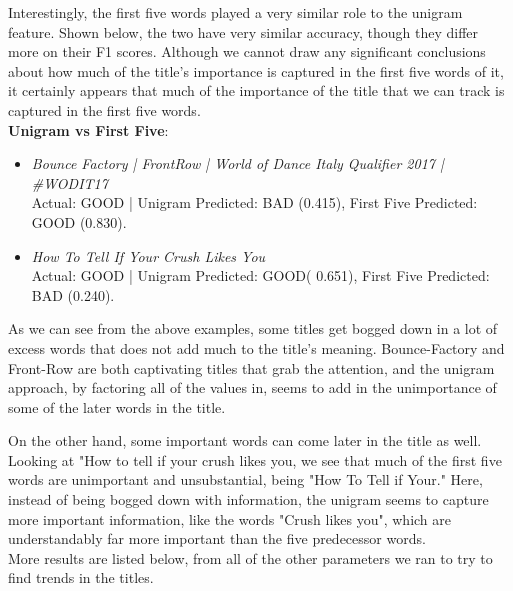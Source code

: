 \documentclass[a4paper,12pt]{article}
\begin{document}
Interestingly, the first five words played a very similar role to the unigram feature. Shown below, the two have very similar accuracy, though they differ more on their F1 scores. Although we cannot draw any significant conclusions about how much of the title's importance is captured in the first five words of it, it certainly appears that much of the importance of the title that we can track is captured in the first five words.
\\

\textbf{Unigram vs First Five}:

\begin{itemize}
		\item \textit{Bounce Factory | FrontRow | World of Dance Italy Qualifier 2017 | \#WODIT17} \\
	Actual: GOOD | Unigram Predicted: BAD (0.415), First Five Predicted: GOOD (0.830).
	
	\item \textit{How To Tell If Your Crush Likes You}\\
	 Actual: GOOD | Unigram Predicted: GOOD( 0.651), First Five Predicted: BAD (0.240).
 
 \end{itemize}
 
 As we can see from the above examples, some titles get bogged down in a lot of excess words that does not add much to the title's meaning. Bounce-Factory and Front-Row are both captivating titles that grab the attention, and the unigram approach, by factoring all of the values in, seems to add in the unimportance of some of the later words in the title.
 
 On the other hand, some important words can come later in the title as well. Looking at "How to tell if your crush likes you, we see that much of the first five words are unimportant and unsubstantial, being "How To Tell if Your." Here, instead of being bogged down with information, the unigram seems to capture more important information, like the words "Crush likes you", which are understandably far more important than the five predecessor words. \\
 
 More results are listed below, from all of the other parameters we ran to try to find trends in the titles.
\end{document}
